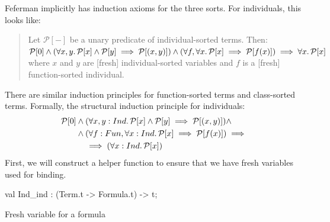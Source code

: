 \begin{node}
Feferman implicitly has induction axioms for the three sorts. For
individuals, this looks like:
\begin{quote}
Let $\mathcal{P}[-]$ be a unary predicate of individual-sorted
terms. Then: $\mathcal{P}[0]\land(\forall x,y\ldotp\mathcal{P}[x]\land\mathcal{P}[y]\implies\mathcal{P}[(x,y)])\land(\forall f,\forall x\ldotp\mathcal{P}[x]\implies\mathcal{P}[f(x)])\implies\forall x\ldotp\mathcal{P}[x]$ 
where $x$ and $y$ are [fresh] individual-sorted variables and $f$ is a [fresh]
function-sorted individual.
\end{quote}
There are similar induction principles for function-sorted terms and
class-sorted terms. Formally, the structural induction principle for individuals:
\begin{equation}
\begin{split}
\mathcal{P}[0]&\land(\forall x,y:Ind\ldotp\mathcal{P}[x]\land\mathcal{P}[y]\implies\mathcal{P}[(x,y)])\land\\
&\land(\forall f:Fun,\forall x:Ind\ldotp\mathcal{P}[x]\implies\mathcal{P}[f(x)])\implies\\
&\quad\implies(\forall x:Ind\ldotp\mathcal{P}[x])
\end{split}
\end{equation}
First, we will construct a helper function to ensure that we have
fresh variables used for binding.
\end{node}

\nwenddocs{}\plusendmoddef\nwstartdeflinemarkup{}\nwenddeflinemarkup
val Ind_ind : (Term.t -> Formula.t) -> t;
\nwendcode{}\nwdocspar

\nwenddocs{}\plusendmoddef\nwstartdeflinemarkup{}\nwenddeflinemarkup
\LA{}Fresh variable for a formula~{\nwtagstyle{}}\RA{}

